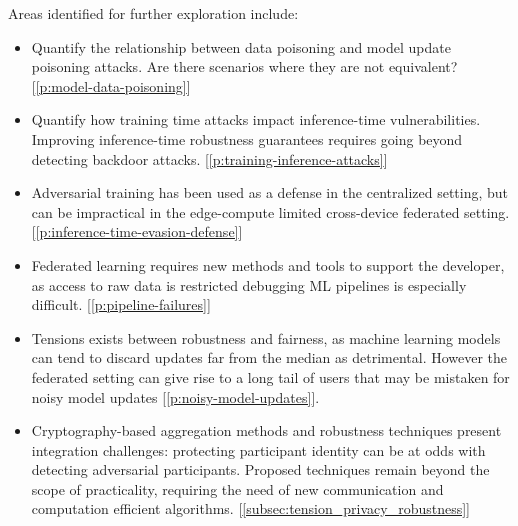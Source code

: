 Areas identified for further exploration include:

\begin{itemize}
  \item Quantify the relationship between data poisoning and model update poisoning attacks. Are there scenarios where they are not equivalent? [\ref{p:model-data-poisoning}]
  \item Quantify how training time attacks impact inference-time vulnerabilities. Improving inference-time robustness guarantees requires going beyond detecting backdoor attacks. [\ref{p:training-inference-attacks}]
  \item Adversarial training has been used as a defense in the centralized setting, but can be impractical in the edge-compute limited cross-device federated setting. [\ref{p:inference-time-evasion-defense}]
  \item Federated learning requires new methods and tools to support the developer, as access to raw data is restricted debugging ML pipelines is especially difficult. [\ref{p:pipeline-failures}]
  \item Tensions exists between robustness and fairness, as machine learning models can tend to discard updates far from the median as detrimental. However the federated setting can give rise to a long tail of users that may be mistaken for noisy model updates [\ref{p:noisy-model-updates}].  
  \item Cryptography-based aggregation methods and robustness techniques present integration challenges: protecting participant identity can be at odds with detecting adversarial participants. Proposed techniques remain beyond the scope of practicality, requiring the need of new communication and computation efficient algorithms. [\ref{subsec:tension_privacy_robustness}]
\end{itemize}

\pagebreak 

